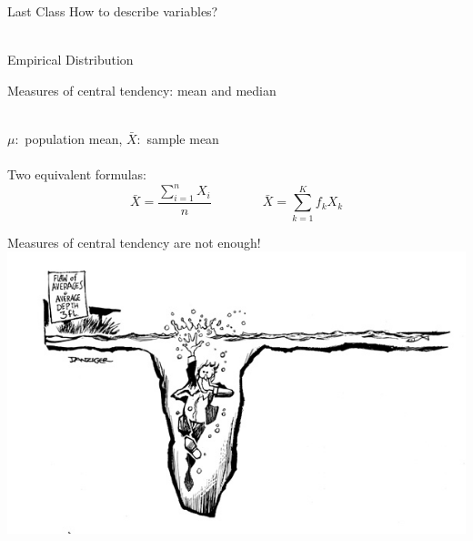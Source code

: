 \documentclass{./../div_teaching_slides}
\begin{document}
\begin{frame}{Last Class}
How to describe variables? \\~\\
\begin{witemize}
  \item Empirical Distribution
  \item Measures of central tendency: mean and median \\~\\
\end{witemize}
$\mu:$ population mean, $\bar{X}:$ sample mean \\~\\
Two equivalent formulas:
$$ \bar{X} = \frac {\sum_{i=1}^n X_i}{n} \quad \quad \quad \quad \bar{X} = \sum_{k=1}^K f_k X_k $$
\end{frame}

\begin{frame}{Measures of central tendency are not enough!}
\centering \vspace{-0.5em}
\includegraphics[scale=0.525]{flaw}
\end{frame}
\end{document}
